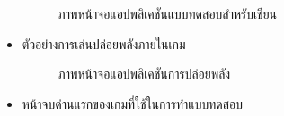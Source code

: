 \documentclass[12pt,oneside,openright,a4paper]{cpe-thai-project}
\begin{document}
\begin{itemize}
\begin{figure}[!h]
    \caption{ภาพหน้าจอแอปพลิเคชันแบบทดสอบสำหรับเขียน}\label{fig:system}
  \end{figure}
 \item   ตัวอย่างการเล่นปล่อยพลังภายในเกม
 \begin{figure}[!h]\centering
    \setlength{\fboxrule}{0.2mm} %
    \setlength{\fboxsep}{1cm}
    \caption{ภาพหน้าจอแอปพลิเคชันการปล่อยพลัง}\label{fig:system}
  \end{figure}       
  \newpage   
 \item หน้าจบด่านแรกของเกมที่ใช้ในการทำแบบทดสอบ
 \begin{figure}[!h]\centering
    \setlength{\fboxrule}{0.2mm} %
    \setlength{\fboxsep}{1cm}

\end{figure}
\end{itemize}
\end{document}
